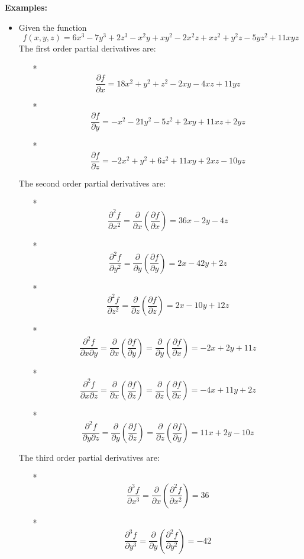 \documentclass{article}
\begin{document}
\textbf{Examples:}
\begin{itemize}
\item Given the function 
\[f(x, y, z) = 6x^3 - 7y^3 + 2z^3 - x^2y + xy^2 - 2x^2z + xz^2 + y^2z - 5yz^2 + 11xyz\]  
The first order partial derivatives are:
\begin{itemize}
\item[*] 
\[\frac{\partial f}{\partial x} = 18x^2 + y^2 + z^2 - 2xy - 4xz + 11yz\]
\item[*]
\[\frac{\partial f}{\partial y} = -x^2 - 21y^2 - 5z^2 + 2xy + 11xz + 2yz\]  
\item[*]
\[\frac{\partial f}{\partial z} =  -2x^2 + y^2 + 6z^2 + 11xy + 2xz - 10yz\]
\end{itemize}
The second order partial derivatives are: 
\begin{itemize}
\item[*]
\[\frac{\partial^2 f}{\partial x^2} = \frac{\partial}{\partial x}\left(\frac{\partial f}{\partial x}\right) = 36x - 2y - 4z\]
\item[*]
\[\frac{\partial^2 f}{\partial y^2} = \frac{\partial}{\partial y}\left(\frac{\partial f}{\partial y}\right) = 2x - 42y + 2z\]
\item[*]
\[\frac{\partial^2 f}{\partial z^2} = \frac{\partial}{\partial z}\left(\frac{\partial f}{\partial z}\right) = 2x - 10y + 12z\]
\item[*]
\[\frac{\partial^2 f}{\partial x \partial y} = \frac{\partial}{\partial x}\left(\frac{\partial f}{\partial y}\right) = \frac{\partial}{\partial y}\left(\frac{\partial f}{\partial x}\right) = -2x + 2y + 11z\]
\item[*]
\[\frac{\partial^2 f}{\partial x \partial z} = \frac{\partial}{\partial x}\left(\frac{\partial f}{\partial z}\right) = \frac{\partial}{\partial z}\left(\frac{\partial f}{\partial x}\right) = -4x + 11y + 2z\]
\item[*]
\[\frac{\partial^2 f}{\partial y \partial z} = \frac{\partial}{\partial y}\left(\frac{\partial f}{\partial z}\right) = \frac{\partial}{\partial z}\left(\frac{\partial f}{\partial y}\right) = 11x + 2y - 10z\]
\end{itemize}
The third order partial derivatives are:
\begin{itemize}
\item[*] 
\[\frac{\partial^3 f}{\partial x^3} = \frac{\partial}{\partial x}\left(\frac{\partial^2 f}{\partial x^2}\right) = 36\] 
\item[*] 
\[\frac{\partial^3 f}{\partial y^3} = \frac{\partial}{\partial y}\left(\frac{\partial^2 f}{\partial y^2}\right) = -42\] 

\end{itemize}
\end{itemize}
\end{document}

